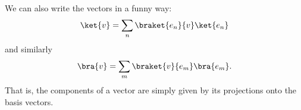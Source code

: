 We can also write the vectors in a funny way:
\begin{equation}
    \ket{v}=\sum_n \braket{e_n}{v}\ket{e_n}
\end{equation}
and similarly
\begin{equation}
    \bra{v} =\sum_m \braket{v}{e_m} \bra{e_m}.
\end{equation}
That is, the components of a vector are simply given by its projections onto the basis vectors.